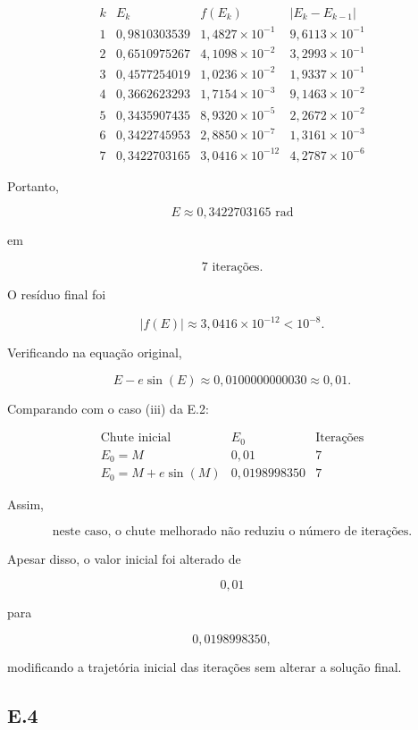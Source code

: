 \documentclass[
	12pt,				%
	openright,			%
	a4paper,			%
	english,			%
	french,				%
	spanish,			%
	brazil,				%
	]{abntex2}
\begin{document}
\[
\begin{array}{c|c|c|c}
k & E_k & f(E_k) & |E_k-E_{k-1}| \\ \hline
1 & 0,9810303539 & 1,4827\times10^{-1} & 9,6113\times10^{-1} \\
2 & 0,6510975267 & 4,1098\times10^{-2} & 3,2993\times10^{-1} \\
3 & 0,4577254019 & 1,0236\times10^{-2} & 1,9337\times10^{-1} \\
4 & 0,3662623293 & 1,7154\times10^{-3} & 9,1463\times10^{-2} \\
5 & 0,3435907435 & 8,9320\times10^{-5} & 2,2672\times10^{-2} \\
6 & 0,3422745953 & 2,8850\times10^{-7} & 1,3161\times10^{-3} \\
7 & 0,3422703165 & 3,0416\times10^{-12} & 4,2787\times10^{-6}
\end{array}
\]

Portanto,

\[
\boxed{E\approx0,3422703165\text{ rad}}
\]

em

\[
\boxed{7\text{ iterações}}.
\]

O resíduo final foi

\[
|f(E)|
\approx
3,0416\times10^{-12}
<
10^{-8}.
\]

Verificando na equação original,

\[
E-e\sin(E)
\approx
0,0100000000030
\approx
0,01.
\]

Comparando com o caso (iii) da E.2:

\[
\begin{array}{c|c|c}
\text{Chute inicial} & E_0 & \text{Iterações} \\ \hline
E_0=M
& 0,01
& 7 \\
E_0=M+e\sin(M)
& 0,0198998350
& 7
\end{array}
\]

Assim,

\[
\boxed{\text{neste caso, o chute melhorado não reduziu o número de iterações.}}
\]

Apesar disso, o valor inicial foi alterado de

\[
0,01
\]

para

\[
0,0198998350,
\]

modificando a trajetória inicial das iterações sem alterar a solução final.

\subsection*{E.4}
\end{document}
